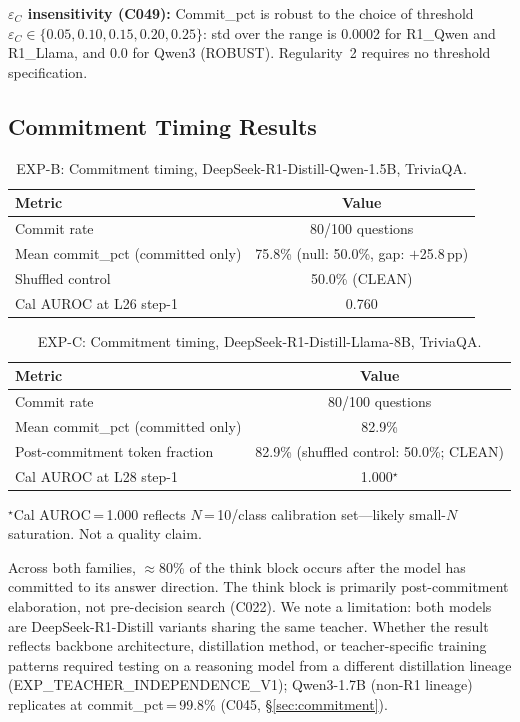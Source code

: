 \documentclass[11pt]{article}
\begin{document}
\textbf{$\varepsilon_C$ insensitivity (C049):} Commit\_pct is robust to the choice of
threshold $\varepsilon_C \in \{0.05, 0.10, 0.15, 0.20, 0.25\}$: std over the range
is 0.0002 for R1\_Qwen and R1\_Llama, and 0.0 for Qwen3 (ROBUST). Regularity~2
requires no threshold specification.

\subsection{Commitment Timing Results}

\begin{table}[h!]
\centering
\caption{EXP-B: Commitment timing, DeepSeek-R1-Distill-Qwen-1.5B, TriviaQA.}
\begin{tabular}{lc}
\toprule
Metric & Value \\
\midrule
Commit rate & 80/100 questions \\
Mean commit\_pct (committed only) & 75.8\% (null: 50.0\%, gap: $+$25.8\,pp) \\
Shuffled control & 50.0\% (CLEAN) \\
Cal AUROC at L26 step-1 & 0.760 \\
\bottomrule
\end{tabular}
\end{table}

\begin{table}[h!]
\centering
\caption{EXP-C: Commitment timing, DeepSeek-R1-Distill-Llama-8B, TriviaQA.}
\begin{tabular}{lc}
\toprule
Metric & Value \\
\midrule
Commit rate & 80/100 questions \\
Mean commit\_pct (committed only) & 82.9\% \\
Post-commitment token fraction & 82.9\% (shuffled control: 50.0\%; CLEAN) \\
Cal AUROC at L28 step-1 & 1.000$^\star$ \\
\bottomrule
\end{tabular}
\end{table}

\noindent $^\star$Cal AUROC\,=\,1.000 reflects $N$\,=\,10/class calibration set---likely
small-$N$ saturation. Not a quality claim.

Across both families, $\approx$80\% of the think block occurs after the model has
committed to its answer direction. The think block is primarily post-commitment
elaboration, not pre-decision search (C022). We note a limitation: both models are
DeepSeek-R1-Distill variants sharing the same teacher. Whether the result reflects
backbone architecture, distillation method, or teacher-specific training patterns
required testing on a reasoning model from a different distillation lineage
(EXP\_TEACHER\_INDEPENDENCE\_V1); Qwen3-1.7B (non-R1 lineage) replicates at commit\_pct\,=\,99.8\% (C045, §\ref{sec:commitment}).
\end{document}
